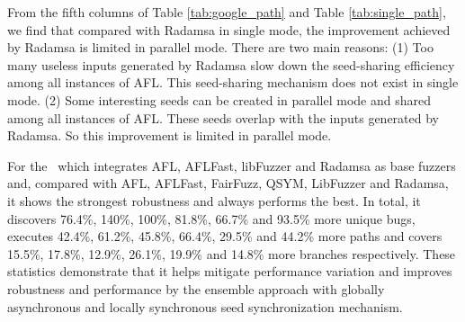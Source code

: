 From the fifth columns of Table \ref{tab:google_path} and Table \ref{tab:single_path}, we find that compared with Radamsa in single mode, the improvement achieved by Radamsa is limited in parallel mode. There are two main reasons:
(1) Too many useless inputs generated by Radamsa slow down the seed-sharing efficiency among all instances of AFL. This seed-sharing mechanism does not exist in single mode.
(2) Some interesting seeds can be created in parallel mode and shared among all instances of AFL. 
These seeds overlap with the inputs generated by Radamsa. So this improvement is limited in parallel mode.


For the \toolThree ~which integrates AFL, AFLFast, libFuzzer and Radamsa as base fuzzers and, compared with AFL, AFLFast, FairFuzz, QSYM, LibFuzzer and Radamsa, it shows the strongest robustness and always performs the best.
In total, it discovers 76.4\%, 140\%, 100\%, 81.8\%, 66.7\% and 93.5\% more unique bugs, executes 42.4\%, 61.2\%, 45.8\%, 66.4\%, 29.5\% and 44.2\% more paths and covers 15.5\%, 17.8\%, 12.9\%, 26.1\%, 19.9\% and 14.8\% more branches respectively.
These statistics demonstrate that it helps mitigate performance variation and improves robustness and performance by the ensemble  approach  with  globally  asynchronous  and  locally  synchronous seed synchronization mechanism.
